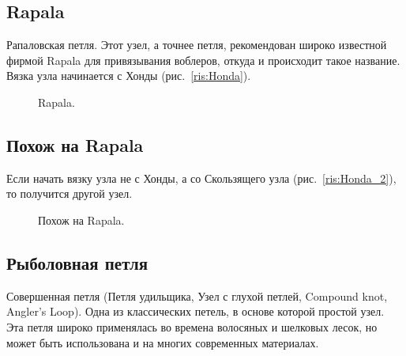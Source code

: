 \subsection{Rapala}

Рапаловская петля. Этот узел, а точнее петля, рекомендован широко известной фирмой Rapala для привязывания воблеров, откуда и происходит такое название. Вязка узла начинается с Хонды (рис.~\ref{ris:Honda}).


\begin{figure}[H]\centering
	\begin{minipage}{1\linewidth}
		\begin{center}
			\tcbox[enhanced jigsaw,colframe=black,opacityframe=0.5,opacityback=0.5]
			{\centering{}}
		\end{center}
	\end{minipage}
\caption{Rapala.}
\label{ris:Rapala}
\end{figure}

\subsection{Похож на Rapala}

Если начать вязку узла не с Хонды, а со Скользящего узла (рис.~\ref{ris:Honda_2}), то получится другой узел.

\begin{figure}[H]\centering
	\begin{minipage}{1\linewidth}
		\begin{center}
			\tcbox[enhanced jigsaw,colframe=black,opacityframe=0.5,opacityback=0.5]
			{\centering{}}
		\end{center}
	\end{minipage}
\caption{Похож на Rapala.}
\label{ris:Rapala_2}
\end{figure}

\subsection{Рыболовная петля}

Совершенная петля (Петля удильщика, Узел с глухой петлей, Compound knot, Angler’s Loop). Одна из классических петель, в основе которой простой узел. Эта петля широко применялась во времена волосяных и шелковых лесок, но может быть использована и на многих современных материалах.

